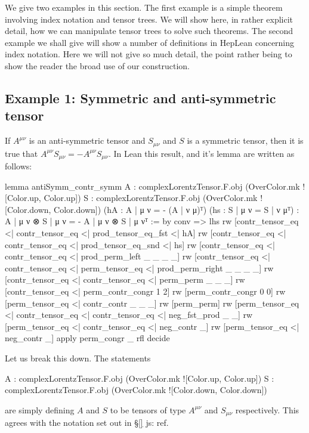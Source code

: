 \documentclass[a4paper, 11pt]{article}
\newcommand{\js}[1]{ {\color{magenta} js:  #1}}
\begin{document}
We give two examples in this section. The first example is a simple theorem involving index notation and 
tensor trees. We will show here, in rather explicit detail, how we can manipulate tensor trees to solve 
such theorems. 
The second example we shall give will show a number of definitions in HepLean concerning index notation.
Here we will not give so much detail, the point rather being to show the reader the broad use of our 
construction. 

\subsection{Example 1: Symmetric and anti-symmetric tensor} \label{sec:exampleSymmAntiSymm}
If $A^{\mu \nu}$ is an anti-symmetric tensor and $S_{\mu \nu}$ and $S$ is a symmetric tensor, then
it is true that $A^{\mu \nu} S_{\mu \nu} = - A^{\mu \nu} S_{\mu \nu}$. In Lean this result, and 
it's lemma are written as follows: 
\begin{code}
lemma antiSymm_contr_symm 
    {A : complexLorentzTensor.F.obj (OverColor.mk ![Color.up, Color.up])}
    {S : complexLorentzTensor.F.obj (OverColor.mk ![Color.down, Color.down])}
    (hA : {A | μ ν = - (A | ν μ)}ᵀ) (hs : {S | μ ν = S | ν μ}ᵀ) :
    {A | μ ν ⊗ S | μ ν = - A | μ ν ⊗ S | μ ν}ᵀ := by
  conv =>
    lhs
    rw [contr_tensor_eq <| contr_tensor_eq <| prod_tensor_eq_fst <| hA]
    rw [contr_tensor_eq <| contr_tensor_eq <| prod_tensor_eq_snd <| hs]
    rw [contr_tensor_eq <| contr_tensor_eq <| prod_perm_left _ _ _ _]
    rw [contr_tensor_eq <| contr_tensor_eq <| perm_tensor_eq <| prod_perm_right _ _ _ _]
    rw [contr_tensor_eq <| contr_tensor_eq <| perm_perm _ _ _]
    rw [contr_tensor_eq <| perm_contr_congr 1 2]
    rw [perm_contr_congr 0 0]
    rw [perm_tensor_eq <| contr_contr _ _ _]
    rw [perm_perm]
    rw [perm_tensor_eq <| contr_tensor_eq <| contr_tensor_eq <| neg_fst_prod _ _]
    rw [perm_tensor_eq <| contr_tensor_eq <| neg_contr _]
    rw [perm_tensor_eq <| neg_contr _]
  apply perm_congr _ rfl
  decide
\end{code}
Let us break this down. The statements 
\begin{code} 
{A : complexLorentzTensor.F.obj (OverColor.mk ![Color.up, Color.up])}
{S : complexLorentzTensor.F.obj (OverColor.mk ![Color.down, Color.down])}
\end{code}
are simply defining $A$ and $S$ to be tensors of type $A^{\mu \nu}$ and $S_{\mu \nu}$ respectively.
This agrees with the notation set out in \S\ref{} \js{ref}.
\end{document}
